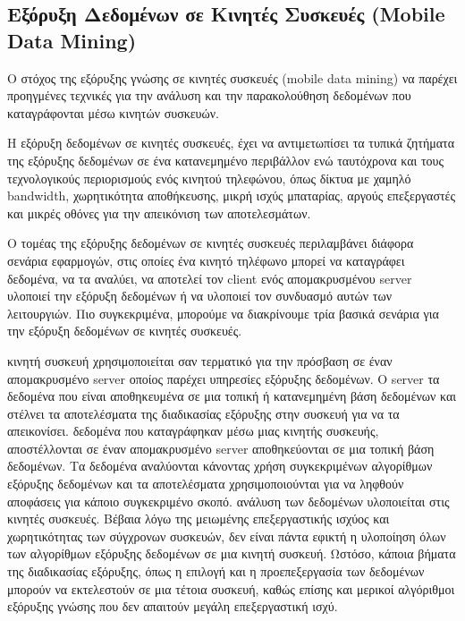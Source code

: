 \documentclass[12pt,twoside,openright]{report}
\begin{document}
\subsection{Εξόρυξη Δεδομένων σε Κινητές Συσκευές (\lt Mobile Data Mining)\gt}
Ο στόχος της εξόρυξης γνώσης σε κινητές συσκευές (\lt mobile data mining)  να παρέχει προηγμένες τεχνικές για την ανάλυση και την παρακολούθηση δεδομένων που καταγράφονται μέσω κινητών συσκευών\cite{mobmining2010talia}.

Η εξόρυξη δεδομένων σε κινητές συσκευές, έχει να αντιμετωπίσει τα τυπικά ζητήματα της εξόρυξης δεδομένων σε ένα κατανεμημένο περιβάλλον ενώ ταυτόχρονα και τους τεχνολογικούς περιορισμούς ενός κινητού τηλεφώνου, όπως δίκτυα με χαμηλό \lt bandwidth,  χωρητικότητα αποθήκευσης, μικρή ισχύς μπαταρίας, αργούς επεξεργαστές και μικρές οθόνες για την απεικόνιση των αποτελεσμάτων\cite{Pittie:2003}.

Ο τομέας της εξόρυξης δεδομένων σε κινητές συσκευές περιλαμβάνει διάφορα σενάρια εφαρμογών, στις οποίες ένα κινητό τηλέφωνο μπορεί να καταγράφει δεδομένα, να τα αναλύει, να αποτελεί τον \lt client \gt ενός απομακρυσμένου \lt server  υλοποιεί την εξόρυξη δεδομένων ή να υλοποιεί τον συνδυασμό αυτών των λειτουργιών. Πιο συγκεκριμένα, μπορούμε να διακρίνουμε τρία βασικά σενάρια για την εξόρυξη δεδομένων σε κινητές συσκευές\cite{mobmining2010talia}.
\begin{enumerate}
 κινητή συσκευή χρησιμοποιείται σαν τερματικό για την πρόσβαση σε έναν απομακρυσμένο \lt server  οποίος παρέχει υπηρεσίες εξόρυξης δεδομένων. Ο \lt server  τα δεδομένα που είναι αποθηκευμένα σε μια τοπική ή κατανεμημένη βάση δεδομένων και στέλνει τα αποτελέσματα της διαδικασίας εξόρυξης στην συσκευή για να τα απεικονίσει.
 δεδομένα που καταγράφηκαν μέσω μιας κινητής συσκευής, αποστέλλονται σε έναν απομακρυσμένο \lt server  αποθηκεύονται σε μια τοπική βάση δεδομένων. Τα δεδομένα αναλύονται κάνοντας χρήση συγκεκριμένων αλγορίθμων εξόρυξης δεδομένων και τα αποτελέσματα χρησιμοποιούνται για να ληφθούν αποφάσεις για κάποιο συγκεκριμένο σκοπό.
 ανάλυση των δεδομένων υλοποιείται στις κινητές συσκευές. Βέβαια λόγω της μειωμένης επεξεργαστικής ισχύος και χωρητικότητας των σύγχρονων συσκευών, δεν είναι πάντα εφικτή η υλοποίηση όλων των αλγορίθμων εξόρυξης δεδομένων σε μια κινητή συσκευή. Ωστόσο, κάποια βήματα της διαδικασίας εξόρυξης, όπως η επιλογή και η προεπεξεργασία των δεδομένων μπορούν να εκτελεστούν σε μια τέτοια συσκευή, καθώς επίσης και μερικοί αλγόριθμοι εξόρυξης γνώσης που δεν απαιτούν μεγάλη επεξεργαστική ισχύ. 
\end{enumerate}
\end{document}
